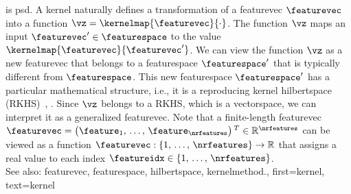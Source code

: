 {{	 	is \gls{psd}. 
     		A kernel naturally defines a transformation of a \gls{featurevec} $\featurevec$ into a 
	 	\gls{function} $\vz = \kernelmap{\featurevec}{\cdot}$. The \gls{function} $\vz$ maps an  
	 	input $\featurevec' \in \featurespace$ to the value $\kernelmap{\featurevec}{\featurevec'}$. 
	 	We can view the \gls{function} $\vz$ as a new \gls{featurevec} that belongs to a 
	 	\gls{featurespace} $\featurespace'$ that is typically different from $\featurespace$. 
	 	This new \gls{featurespace} $\featurespace'$ has a particular mathematical structure, i.e., it is a 
	 	reproducing kernel \gls{hilbertspace} (RKHS)~\cite{LearningKernelsBook}, \cite{LampertNowKernel}.
     		Since $\vz$ belongs to a RKHS, which is a \gls{vectorspace}, we can interpret it as a generalized 
	 	\gls{featurevec}. Note that a finite-length \gls{featurevec} $\featurevec=\big(\feature_{1}, \,\ldots, \,\feature_{\nrfeatures} \big)\,^{T} \in \mathbb{R}^{\nrfeatures}$ 
	 	can be viewed as a \gls{function} $\featurevec: \{1, \,\ldots, \,\nrfeatures\} \rightarrow \mathbb{R}$ 
	 	that assigns a real value to each index $\featureidx \in \{1, \,\ldots, \,\nrfeatures\}$.
          		\\
		See also: \gls{featurevec}, \gls{featurespace}, \gls{hilbertspace}, \gls{kernelmethod}.},
	first={kernel},
	text={kernel} 
}
	
